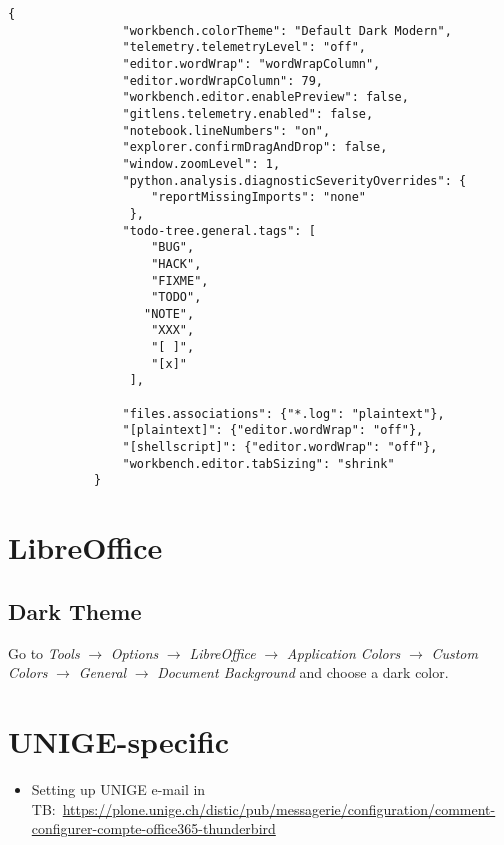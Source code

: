 \documentclass[12pt, a4paper]{article}
\numberwithin{equation}{section}
\theoremstyle{definition}
\theoremstyle{definition}
\begin{document}
		\begin{lstlisting}[style=mystylebash, label=alg:vscode__settings_file, xleftmargin=\parindent]
			{
				"workbench.colorTheme": "Default Dark Modern",
				"telemetry.telemetryLevel": "off",
				"editor.wordWrap": "wordWrapColumn",
				"editor.wordWrapColumn": 79,
				"workbench.editor.enablePreview": false,
				"gitlens.telemetry.enabled": false,
				"notebook.lineNumbers": "on",
				"explorer.confirmDragAndDrop": false,
				"window.zoomLevel": 1, 
				"python.analysis.diagnosticSeverityOverrides": {
				    "reportMissingImports": "none"
				 }, 
			 	"todo-tree.general.tags": [
				    "BUG",
				    "HACK",
				    "FIXME",
				    "TODO",
			 	   "NOTE",
				    "XXX",
				    "[ ]",
				    "[x]"
				 ],

				"files.associations": {"*.log": "plaintext"},
				"[plaintext]": {"editor.wordWrap": "off"}, 
				"[shellscript]": {"editor.wordWrap": "off"},
				"workbench.editor.tabSizing": "shrink"
			}
		\end{lstlisting}
	
	\newpage 
	
	\section{LibreOffice}
	
	\subsection{Dark Theme}
	
		Go to \textit{Tools} $\rightarrow$ \textit{Options} $\rightarrow$ \textit{LibreOffice} $\rightarrow$ \textit{Application Colors} $\rightarrow$ \textit{Custom Colors} $\rightarrow$ \textit{General} $\rightarrow$ \textit{Document Background} and choose a dark color.

	\newpage 
	
	\section{UNIGE-specific}
	
	\begin{itemize}
		\item Setting up UNIGE e-mail in TB:~\newline\url{https://plone.unige.ch/distic/pub/messagerie/configuration/comment-configurer-compte-office365-thunderbird}
	\end{itemize}
	
\end{document}

